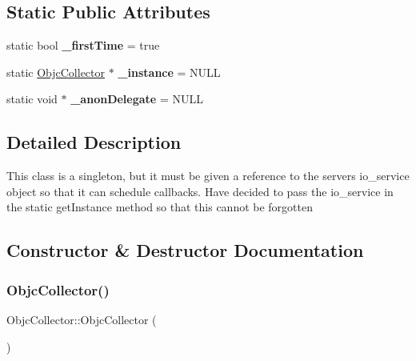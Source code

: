 \subsection*{Static Public Attributes}
\begin{DoxyCompactItemize}
\item 
\mbox{\label{class_objc_collector_a3b76feca4dba6fa500115a8731e5bbdf}} 
static bool {\bfseries \+\_\+first\+Time} = true
\item 
\mbox{\label{class_objc_collector_af04ba5a0277f3b48b7fb7c2f0a56f684}} 
static \hyperlink{class_objc_collector}{Objc\+Collector} $\ast$ {\bfseries \+\_\+instance} = N\+U\+LL
\item 
\mbox{\label{class_objc_collector_a31d2f9e91e62e9346e6a496a95dce8ee}} 
static void $\ast$ {\bfseries \+\_\+anon\+Delegate} = N\+U\+LL
\end{DoxyCompactItemize}


\subsection{Detailed Description}
This class is a singleton, but it must be given a reference to the servers io\+\_\+service object so that it can schedule callbacks. Have decided to pass the io\+\_\+service in the static get\+Instance method so that this cannot be forgotten 

\subsection{Constructor \& Destructor Documentation}
\mbox{\label{class_objc_collector_a8648b6ea89441339da4f8386b3132fdf}} 
\subsubsection{\texorpdfstring{Objc\+Collector()}{ObjcCollector()}}
{\footnotesize\ttfamily Objc\+Collector\+::\+Objc\+Collector (\begin{DoxyParamCaption}\item[{\hyperlink{class_objc_collector}{Objc\+Collector} const \&}]{ }\end{DoxyParamCaption})\hspace{0.3cm}{\ttfamily [delete]}}

